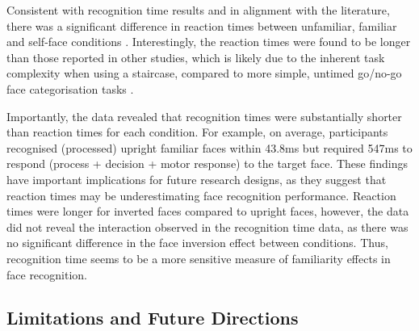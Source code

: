 \documentclass[
  10pt,
  letterpaper,
]{article}
\begin{document}
Consistent with recognition time results and in alignment with the
literature, there was a significant difference in reaction times between
unfamiliar, familiar and self-face conditions
\citep{kloth2006a, ramon2011a, young2017a}. Interestingly, the reaction
times were found to be longer than those reported in other studies,
which is likely due to the inherent task complexity when using a
staircase, compared to more simple, untimed go/no-go face categorisation
tasks \citep{bortolon2017a, burton2016a, ramon2011a, smith2016a}.

Importantly, the data revealed that recognition times were substantially
shorter than reaction times for each condition. For example, on average,
participants recognised (processed) upright familiar faces within 43.8ms
but required 547ms to respond (process + decision + motor response) to
the target face. These findings have important implications for future
research designs, as they suggest that reaction times may be
underestimating face recognition performance. Reaction times were longer
for inverted faces compared to upright faces, however, the data did not
reveal the interaction observed in the recognition time data, as there
was no significant difference in the face inversion effect between
conditions. Thus, recognition time seems to be a more sensitive measure
of familiarity effects in face recognition.

\subsection{Limitations and Future
Directions}\label{limitations-and-future-directions}
\end{document}
